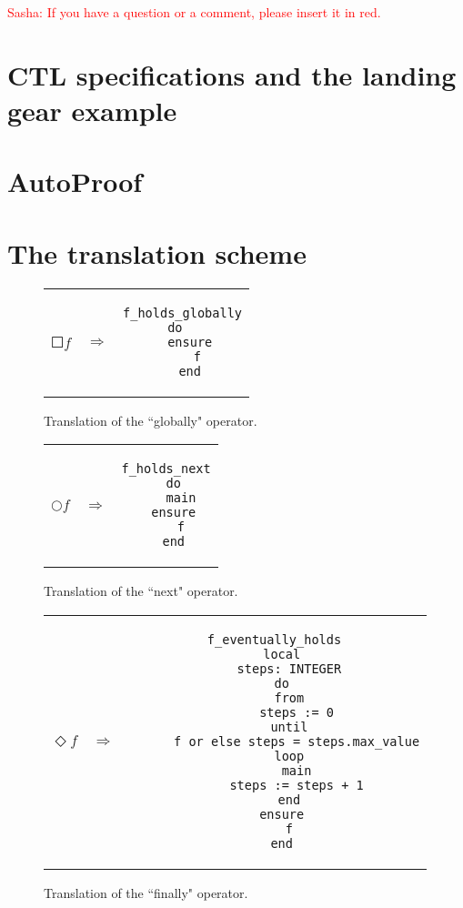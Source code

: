 \textcolor{red}{Sasha: If you have a question or a comment, please insert it in red.}

\section{CTL specifications and the landing gear example}
\label{sec:landing_gear_example}

\cite{arcaini2014modeling}

\section{AutoProof}
\label{sec:autoproof}

\cite{tschannen2015autoproof}

\section{The translation scheme}
\label{sec:translation_scheme}


\begin{figure}
\begin{tabular}{c c c}
$\Square f$
&
$\Longrightarrow$
&
\begin{lstlisting}
f_holds_globally
  do    
  ensure
    f
  end
\end{lstlisting}
\end{tabular}
\caption{Translation of the ``globally" operator.}
\label{fig:ltl_globally_eiffel}
\end{figure}


\begin{figure}
\begin{tabular}{c c c}
$\Circle f$ 
&
$\Longrightarrow$
&
\begin{lstlisting}
f_holds_next
  do
    main
  ensure
    f
  end
\end{lstlisting}
\end{tabular}
\caption{Translation of the ``next" operator.}
\label{fig:ltl_next_eiffel}
\end{figure}


\begin{figure}
\begin{tabular}{c c c}
$\Diamond f$
&
$\Longrightarrow$
&
\begin{lstlisting}
f_eventually_holds
  local
    steps: INTEGER
  do
    from
      steps := 0
    until
      f or else steps = steps.max_value
    loop
      main
      steps := steps + 1
    end
  ensure
    f
  end
\end{lstlisting}
\end{tabular}
\caption{Translation of the ``finally" operator.}
\label{fig:ltl_eventually_eiffel}
\end{figure}


